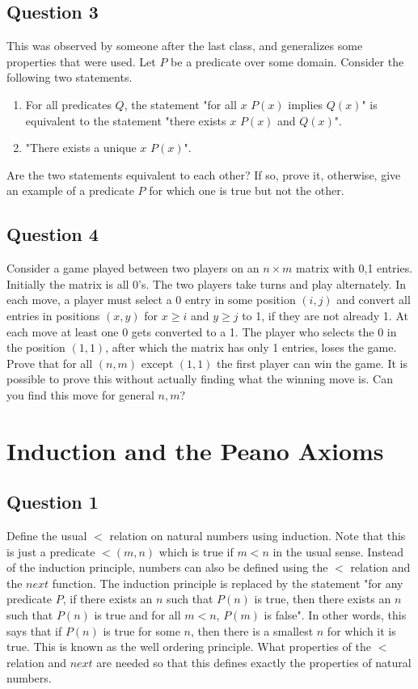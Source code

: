 \documentclass[12pt]{report}
\begin{document}
\section*{Question 3}
This was observed by someone after the last class, and generalizes some properties that were used. Let $P$ be a predicate over some domain. Consider the following two statements.
\begin{enumerate}
  \item For all predicates $Q$, the statement "for all $x$ $P(x)$ implies $Q(x)$" is equivalent to the statement "there exists $x$ $P(x)$ and $Q(x)$".
  \item "There exists a unique $x$ $P(x)$".
\end{enumerate}
Are the two statements equivalent to each other? If so, prove it, otherwise, give an example of a predicate $P$ for which one is true but not the other.
\section*{Question 4}
Consider a game played between two players on an $n \times m$ matrix with 0,1 entries. Initially the matrix is all 0's. The two players take turns and play alternately. In each move, a player must select a 0 entry in some position $(i, j)$ and convert all entries in positions $(x, y)$ for $x \geq i$ and $y \geq j$ to 1, if they are not already 1. At each move at least one 0 gets converted to a 1.
The player who selects the 0 in the position $(1, 1)$, after which the matrix has only 1 entries, loses the game. Prove that for all $(n, m)$ except $(1, 1)$ the first player can win the game. It is possible to prove this without actually finding what the winning move is. Can you find this move for general $n, m$?
\chapter{Induction and the Peano Axioms}
\section*{Question 1}
Define the usual $<$ relation on natural numbers using induction. Note that this is just a predicate $<(m, n)$ which is true if $m < n$ in the usual sense. Instead of the induction principle, numbers can also be defined using the $<$ relation and the $next$ function. The induction principle is replaced by the statement "for any predicate $P$, if there exists an $n$ such that $P(n)$ is true, then there exists an $n$ such that $P(n)$ is true and for all $m < n$, $P(m)$ is false". In other words, this says that if $P(n)$ is true for some $n$, then there is a smallest $n$ for which it is true. This is known as the well ordering principle. What properties of the $<$ relation and $next$ are needed so that this defines exactly the properties of natural numbers.
\end{document}
